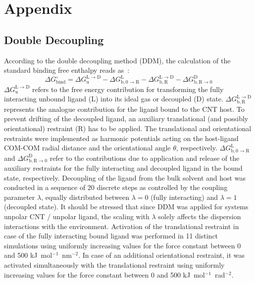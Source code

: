 \documentclass[9pt,lessons,pubversion]{livecoms}
\begin{document}
\section*{Appendix}

\subsection*{Double Decoupling}

According to the double decoupling method (DDM), 
the calculation of the standard binding free enthalpy reads as~\cite{deng2009computations}:
\begin{equation}
\Delta G^\circ_\mathrm{bind} = \Delta G^\mathrm{L \rightarrow D}_\mathrm{u} - \Delta G^\mathrm{L}_\mathrm{b, 0 \rightarrow R} - \Delta G^\mathrm{L \rightarrow D}_\mathrm{b, R} 
- \Delta G^\mathrm{D}_\mathrm{b, R \rightarrow 0} 
\label{eq:DG0_DDM}
\end{equation}
$\Delta G^\mathrm{L \rightarrow D}_\mathrm{u}$ refers to the free energy contribution for transforming the fully interacting unbound ligand (L) into its ideal gas or decoupled (D) state. 
$\Delta G^\mathrm{L \rightarrow D}_\mathrm{b, R}$ represents the analogue contribution for the ligand bound to the CNT host.
To prevent drifting of the decoupled ligand, an auxiliary translational (and possibly orientational) restraint (R) has to be applied.
The translational and orientational restraints were implemented as harmonic potentials acting on the host-ligand COM-COM radial distance and the orientational angle $\theta$, respectively. 
$\Delta G^\mathrm{L}_\mathrm{b, 0 \rightarrow R}$ and $\Delta G^\mathrm{D}_\mathrm{b, R \rightarrow 0}$ refer to the contributions due to application and release of the auxiliary restraints 
for the fully interacting and decoupled ligand in the bound state, respectively.
Decoupling of the ligand from the bulk solvent and host was conducted in a sequence of 20 discrete steps as controlled by the coupling parameter $\lambda$, equally  distributed between $\lambda = 0$ (fully interacting) 
and $\lambda = 1$ (decoupled state).
It should be stressed that since DDM was applied for systems unpolar CNT / unpolar ligand, the scaling with $\lambda$ solely affects the dispersion interactions with the environment.
Activation of the translational restraint in case of the fully interacting bound ligand was performed in 11 distinct simulations using uniformly increasing values for the force constant between 0 and 
500 kJ~mol$^{-1}$~nm$^{-2}$. 
In case of an additional orientational restraint, it was activated simultaneously with the translational restraint using uniformly increasing values for the force constant between 0 and 500 kJ~mol$^{-1}$~rad$^{-2}$.
\end{document}
